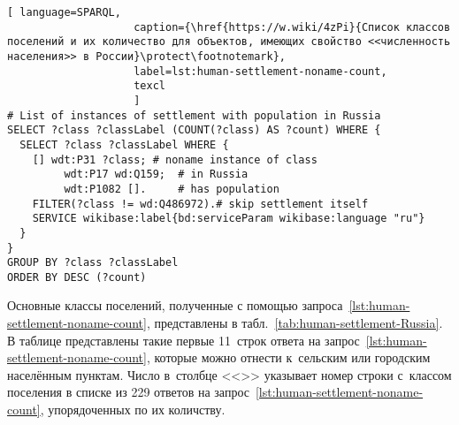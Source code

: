 \begin{lstlisting}[ language=SPARQL, 
                    caption={\href{https://w.wiki/4zPi}{Список классов поселений и их количество для объектов, имеющих свойство <<численность населения>> в России}\protect\footnotemark},
                    label=lst:human-settlement-noname-count,
                    texcl 
                    ]
# List of instances of settlement with population in Russia
SELECT ?class ?classLabel (COUNT(?class) AS ?count) WHERE {
  SELECT ?class ?classLabel WHERE {
    [] wdt:P31 ?class; # noname instance of class
         wdt:P17 wd:Q159;  # in Russia
         wdt:P1082 [].     # has population
    FILTER(?class != wd:Q486972).# skip settlement itself
    SERVICE wikibase:label{bd:serviceParam wikibase:language "ru"}
  }
}
GROUP BY ?class ?classLabel
ORDER BY DESC (?count)
\end{lstlisting}%

Основные классы поселений, полученные с помощью запроса~\ref{lst:human-settlement-noname-count}, 
представлены в табл.~\ref{tab:human-settlement-Russia}. 
В таблице представлены такие первые 11~строк ответа на запрос~\ref{lst:human-settlement-noname-count}, 
    которые можно отнести к~сельским или городским населённым пунктам. 
    Число в~столбце <<\textnumero>> указывает номер строки с~классом поселения 
    в списке из 229 ответов на запрос~\ref{lst:human-settlement-noname-count}, 
    упорядоченных по их количству.



